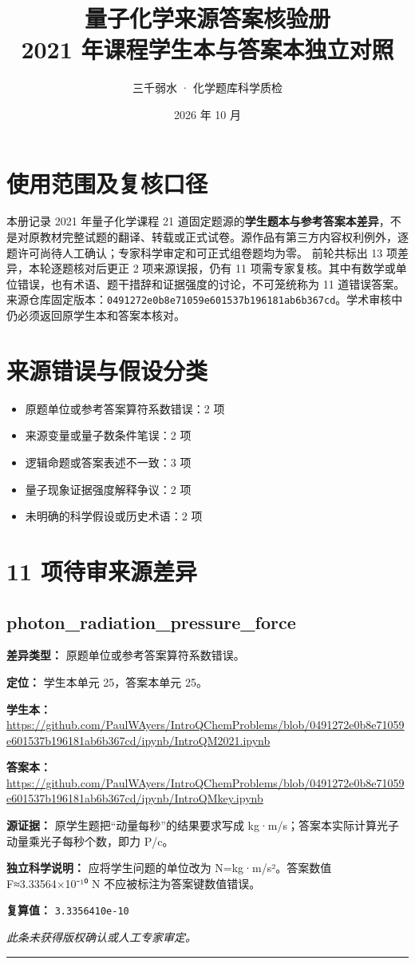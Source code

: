 \documentclass[UTF8,11pt,oneside,openany,fontset=none]{ctexbook}
\title{量子化学来源答案核验册\\[0.5em]\large 2021 年课程学生本与答案本独立对照}
\author{三千弱水 · 化学题库科学质检}
\date{2026 年 10 月}
\begin{document}
\frontmatter
\maketitle
\chapter*{使用范围及复核口径}
本册记录 2021 年量子化学课程 21 道固定题源的\textbf{学生题本与参考答案本差异}，不是对原教材完整试题的翻译、转载或正式试卷。源作品有第三方内容权利例外，逐题许可尚待人工确认；专家科学审定和可正式组卷题均为零。
前轮共标出 13 项差异，本轮逐题核对后更正 2 项来源误报，仍有 11 项需专家复核。其中有数学或单位错误，也有术语、题干措辞和证据强度的讨论，不可笼统称为 11 道错误答案。
来源仓库固定版本：\texttt{0491272e0b8e71059e601537b196181ab6b367cd}。学术审核中仍必须返回原学生本和答案本核对。
\tableofcontents
\mainmatter
\chapter{来源错误与假设分类}
\begin{itemize}
\item 原题单位或参考答案算符系数错误：2 项
\item 来源变量或量子数条件笔误：2 项
\item 逻辑命题或答案表述不一致：3 项
\item 量子现象证据强度解释争议：2 项
\item 未明确的科学假设或历史术语：2 项
\end{itemize}
\chapter{11 项待审来源差异}
\section{photon\_radiation\_pressure\_force}
\noindent\textbf{差异类型：} 原题单位或参考答案算符系数错误。\par
\noindent\textbf{定位：} 学生本单元 25，答案本单元 25。\par
\noindent\textbf{学生本：} \url{https://github.com/PaulWAyers/IntroQChemProblems/blob/0491272e0b8e71059e601537b196181ab6b367cd/ipynb/IntroQM2021.ipynb}\par
\noindent\textbf{答案本：} \url{https://github.com/PaulWAyers/IntroQChemProblems/blob/0491272e0b8e71059e601537b196181ab6b367cd/ipynb/IntroQMkey.ipynb}\par
\noindent\textbf{源证据：} 原学生题把“动量每秒”的结果要求写成 kg·m/s；答案本实际计算光子动量乘光子每秒个数，即力 P/c。\par
\noindent\textbf{独立科学说明：} 应将学生问题的单位改为 N=kg·m/s²。答案数值 F≈3.33564×10⁻¹⁰ N 不应被标注为答案键数值错误。\par
\noindent\textbf{复算值：} \texttt{3.3356410e-10}\par
\medskip\noindent\textit{此条未获得版权确认或人工专家审定。}
\medskip\hrule\medskip
\end{document}
